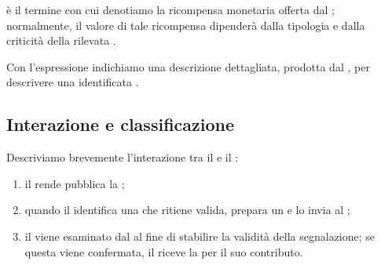 \medskip

\Bountyreward è il termine con cui denotiamo la ricompensa monetaria offerta dal \BI \cite{hoffman2021bountychain}; normalmente, il valore di tale ricompensa dipenderà dalla tipologia e dalla criticità della \vulnerability rilevata \cite{canidio2021verioss}.

\medskip

Con l'espressione \bugreport indichiamo una descrizione dettagliata, prodotta dal \BH, per descrivere una \vulnerability identificata \cite{hoffman2021bountychain}.

\subsection{Interazione e classificazione}

Descriviamo brevemente l'interazione tra il \BI e il \BH \cite{hoffman2021bountychain}:
\begin{enumerate}


\item il \BI rende pubblica la \bugbounty;

\item quando il \BH identifica una \vulnerability che ritiene valida, prepara un \bugreport e lo invia al \BI;

\item il \bugreport viene esaminato dal \BI al fine di stabilire la validità della segnalazione; se questa viene confermata, il \BH riceve la \bountyreward per il suo contributo.

\end{enumerate}



